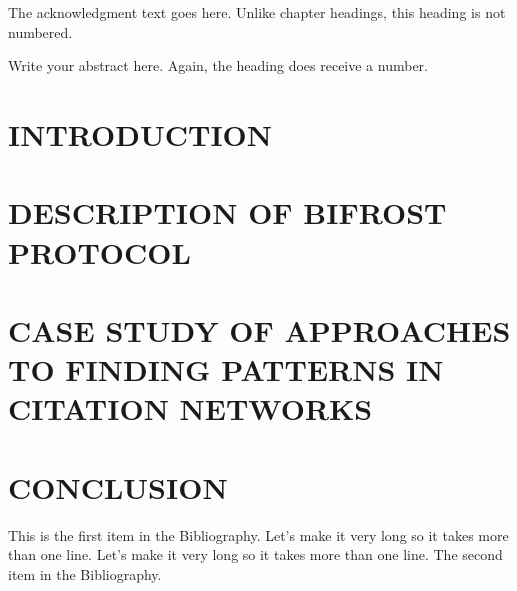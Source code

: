 \documentclass{thesis}
\author{Benjamin Pringle}
\begin{document}
\titlepage             %
\tableofcontents       %
\listoftables          %
\listoffigures         %

The acknowledgment text goes here. Unlike chapter headings,
this heading is not numbered.

Write your abstract here. Again, the heading does receive a number.

\chapter{INTRODUCTION}



\chapter{DESCRIPTION OF BIFROST PROTOCOL}



\chapter{CASE STUDY OF APPROACHES TO FINDING PATTERNS IN CITATION NETWORKS}



\chapter{CONCLUSION}



\begin{singlespace}
\begin{thebibliography}{99}
 This is the first item in the Bibliography.
Let's make it very long so it takes more than one line.
Let's make it very long so it takes more than one line.
 The second item in the Bibliography.
\end{thebibliography}
\end{singlespace}

\appendix    %
\end{document}

